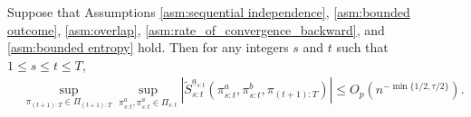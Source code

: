 \medskip


\begin{lemma} \label{lem:convergence_rate_Stilde}
Suppose that Assumptions \ref{asm:sequential independence}, \ref{asm:bounded outcome}, \ref{asm:overlap}, \ref{asm:rate_of_convergence_backward}, and \ref{asm:bounded entropy} hold. 
Then for any integers $s$ and $t$ such that $1\leq s \leq t \leq T$,
\begin{align}
        &\sup_{\pi_{(t+1):T} \in  \Pi_{(t+1):T}}\sup_{\pi_{s:t}^{a},\pi_{s:t}^{a}\in \Pi_{s:t}} \left| \widetilde{S}_{s:t}^{\underline{a}_{s:t}}(\pi_{s:t}^{a},\pi_{s:t}^{b},\pi_{(t+1):T})\right|  \leq  O_{p}(n^{-\min\{1/2,\tau/2\}}). \label{eq:sequential_bound}
\end{align}
\end{lemma}

\medskip

